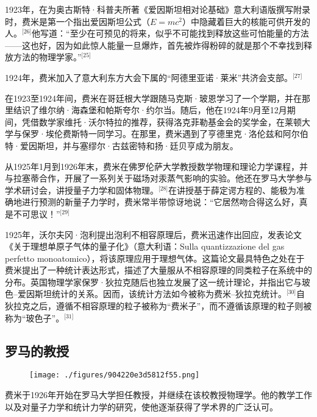 1923年，在为奥古斯特·科普夫所著《爱因斯坦相对论基础》意大利语版撰写附录时，费米是第一个指出爱因斯坦公式（$E = mc^2$）中隐藏着巨大的核能可供开发的人。\(^\text{[26]}\)他写道：“至少在可预见的将来，似乎不可能找到释放这些可怕能量的方法——这也好，因为如此惊人能量一旦爆炸，首先被炸得粉碎的就是那个不幸找到释放方法的物理学家。”\(^\text{[25]}\)

1924年，费米加入了意大利东方大会下属的“阿德里亚诺·莱米”共济会支部。\(^\text{[27]}\)

在1923至1924年间，费米在哥廷根大学跟随马克斯·玻恩学习了一个学期，并在那里结识了维尔纳·海森堡和帕斯夸尔·约尔当。随后，他在1924年9月至12月期间，凭借数学家维托·沃尔特拉的推荐，获得洛克菲勒基金会的奖学金，在莱顿大学与保罗·埃伦费斯特一同学习。在那里，费米遇到了亨德里克·洛伦兹和阿尔伯特·爱因斯坦，并与塞缪尔·古兹密特和扬·廷贝亨成为朋友。

从1925年1月到1926年末，费米在佛罗伦萨大学教授数学物理和理论力学课程，并与拉塞蒂合作，开展了一系列关于磁场对汞蒸气影响的实验。他还在罗马大学参与学术研讨会，讲授量子力学和固体物理。\(^\text{[28]}\)在讲授基于薛定谔方程的、能极为准确地进行预测的新量子力学时，费米常半带惊讶地说：“它居然吻合得这么好，真是不可思议！”\(^\text{[29]}\)

1925年，沃尔夫冈·泡利提出泡利不相容原理后，费米迅速作出回应，发表论文《关于理想单原子气体的量子化》（意大利语：Sulla quantizzazione del gas perfetto monoatomico），将该原理应用于理想气体。这篇论文最具特色之处在于费米提出了一种统计表达形式，描述了大量服从不相容原理的同类粒子在系统中的分布。英国物理学家保罗·狄拉克随后也独立发展了这一统计理论，并指出它与玻色–爱因斯坦统计的关系。因而，该统计方法如今被称为费米–狄拉克统计。\(^\text{[30]}\)自狄拉克之后，遵循不相容原理的粒子被称为“费米子”，而不遵循该原理的粒子则被称为“玻色子”。\(^\text{[31]}\)
\subsection{罗马的教授}
\begin{figure}[ht]
\centering
\texttt{[image: ./figures/904220e3d5812f55.png]}
\caption{} \label{fig_ELK_4}
\end{figure}
费米于1926年开始在罗马大学担任教授，并继续在该校教授物理学。他的教学工作以及对量子力学和统计力学的研究，使他逐渐获得了学术界的广泛认可。

